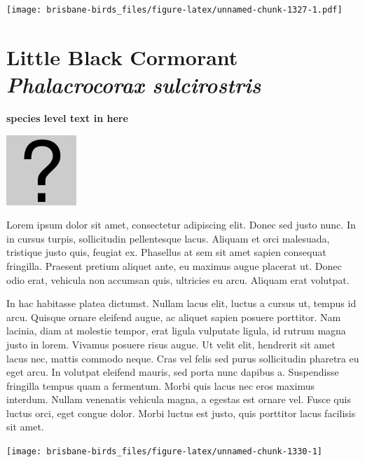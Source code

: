 \documentclass[]{book}
\let\origfigure\figure
\let\endorigfigure\endfigure
\renewenvironment{figure}[1][2] {
  \expandafter\origfigure\expandafter[H]
} {
  \endorigfigure
}
\begin{document}
\begin{figure}
\centering
\texttt{[image: brisbane-birds\_files/figure-latex/unnamed-chunk-1327-1.pdf]}
\caption{\label{fig:unnamed-chunk-1327}insert figure caption}
\end{figure}

\section{\texorpdfstring{Little Black Cormorant \emph{Phalacrocorax
sulcirostris}}{Little Black Cormorant Phalacrocorax sulcirostris}}\label{little-black-cormorant-phalacrocorax-sulcirostris}

\textbf{species level text in here}

\begin{figure}
\centering
\includegraphics{assets/missing.png}
\caption{No image for species}
\end{figure}

Lorem ipsum dolor sit amet, consectetur adipiscing elit. Donec sed justo
nunc. In in cursus turpis, sollicitudin pellentesque lacus. Aliquam et
orci malesuada, tristique justo quis, feugiat ex. Phasellus at sem sit
amet sapien consequat fringilla. Praesent pretium aliquet ante, eu
maximus augue placerat ut. Donec odio erat, vehicula non accumsan quis,
ultricies eu arcu. Aliquam erat volutpat.

In hac habitasse platea dictumst. Nullam lacus elit, luctus a cursus ut,
tempus id arcu. Quisque ornare eleifend augue, ac aliquet sapien posuere
porttitor. Nam lacinia, diam at molestie tempor, erat ligula vulputate
ligula, id rutrum magna justo in lorem. Vivamus posuere risus augue. Ut
velit elit, hendrerit sit amet lacus nec, mattis commodo neque. Cras vel
felis sed purus sollicitudin pharetra eu eget arcu. In volutpat eleifend
mauris, sed porta nunc dapibus a. Suspendisse fringilla tempus quam a
fermentum. Morbi quis lacus nec eros maximus interdum. Nullam venenatis
vehicula magna, a egestas est ornare vel. Fusce quis luctus orci, eget
congue dolor. Morbi luctus est justo, quis porttitor lacus facilisis sit
amet.

\begin{figure}
\texttt{[image: brisbane-birds\_files/figure-latex/unnamed-chunk-1330-1]} \caption{insert figure caption}\label{fig:unnamed-chunk-1330}
\end{figure}
\end{document}
